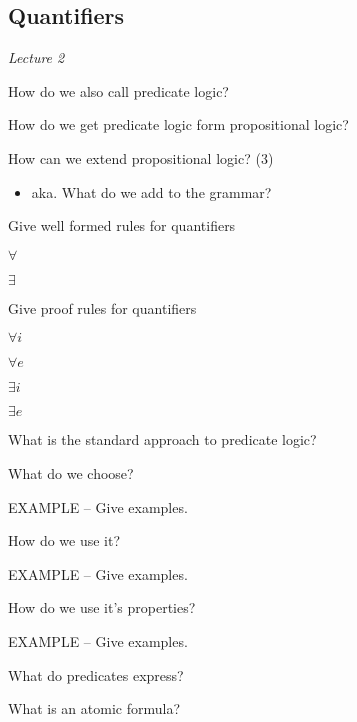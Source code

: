\documentclass[fleqn]{article}
\begin{document}
\subsection{Quantifiers}
\textit{Lecture 2}
\begin{enumerate}
    \item How do we also call predicate logic?
    \item How do we get predicate logic form propositional logic?
    {\color{red}\item How can we extend propositional logic? (3)}
    \begin{itemize}
        \item aka. What do we add to the grammar?
    \end{itemize}
    {\color{red}\item Give well formed rules for quantifiers}
    \begin{itemize}
        {\color{blue}\item $\forall$}
        {\color{red}\item $\exists$}
    \end{itemize}
    {\color{red}\item Give proof rules for quantifiers}
    \begin{itemize}
        {\color{blue}\item $\forall i$}
        {\color{red}\item $\forall e$}
        {\color{blue}\item $\exists i$}
        {\color{blue}\item $\exists e$}
    \end{itemize}
    {\color{red}\item What is the standard approach to predicate logic?}
    \begin{itemize}
        {\color{red}\item What do we choose?}
        {\color{red}\item EXAMPLE -- Give examples.}
        {\color{red}\item How do we use it?}
        {\color{blue}\item EXAMPLE -- Give examples.}
        {\color{red}\item How do we use it's properties?}
        {\color{red}\item EXAMPLE -- Give examples.}
        {\color{blue}\item What do predicates express?}
    \end{itemize}
    {\color{red}\item What is an atomic formula?}

\end{enumerate}
\end{document}
